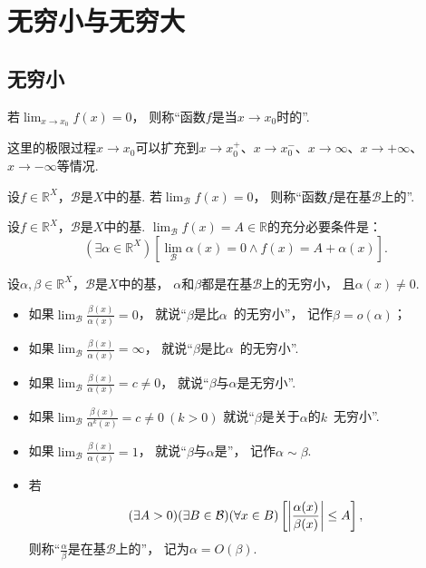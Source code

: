\section{无穷小与无穷大}
\subsection{无穷小}
\begin{definition}
若\(\lim_{x \to x_0} f(x) = 0\)，
则称“函数\(f\)是当\(x \to x_0\)时的”.
\end{definition}
这里的极限过程\(x \to x_0\)可以扩充到\(x \to x_0^+\)、\(x \to x_0^-\)、\(x \to \infty\)、\(x \to +\infty\)、\(x \to -\infty\)等情况.

\begin{definition}
设\(f\in\mathbb{R}^X\)，\(\mathcal{B}\)是\(X\)中的基.
若\(\lim_\mathcal{B} f(x) = 0\)，
则称“函数\(f\)是在基\(\mathcal{B}\)上的”.
\end{definition}

\begin{theorem}
设\(f\in\mathbb{R}^X\)，\(\mathcal{B}\)是\(X\)中的基.
\(\lim_\mathcal{B} f(x) = A \in \mathbb{R}\)的充分必要条件是：\[
	(\exists\alpha\in\mathbb{R}^X)
	\left[
		\lim_\mathcal{B} \alpha(x) = 0
		\land
		f(x) = A + \alpha(x)
	\right].
\]
\end{theorem}

\begin{definition}
设\(\alpha,\beta\in\mathbb{R}^X\)，\(\mathcal{B}\)是\(X\)中的基，
\(\alpha\)和\(\beta\)都是在基\(\mathcal{B}\)上的无穷小，
且\(\alpha(x)\neq0\).
\newcommand{\lf}[1][]{\lim_\mathcal{B} \frac{\beta(x)}{\alpha^{#1}(x)}}
\begin{itemize}
	\item 如果\(\lf=0\)，
	就说“\(\beta\)是比\(\alpha\)~的无穷小”，
	记作\(\beta=o(\alpha)\)；
	\item 如果\(\lf=\infty\)，
	就说“\(\beta\)是比\(\alpha\)~的无穷小”.
	\item 如果\(\lf=c\neq0\)，
	就说“\(\beta\)与\(\alpha\)是无穷小”.
	\item 如果\(\lf[k]=c\neq0\ (k>0)\)
	就说“\(\beta\)是关于\(\alpha\)的\(k\)~无穷小”.
	\item 如果\(\lf=1\)，
	就说“\(\beta\)与\(\alpha\)是”，
	记作\(\alpha\sim\beta\).
	\item 若\[
		(\exists A>0)
		(\exists B\in\mathcal{B})
		(\forall x\in B)
		\left[
			\abs{\frac{\alpha(x)}{\beta(x)}} \leq A
		\right],
	\]
	则称“\(\frac\alpha\beta\)是在基\(\mathcal{B}\)上的”，
	记为\(\alpha = O(\beta)\).
\end{itemize}
\end{definition}

